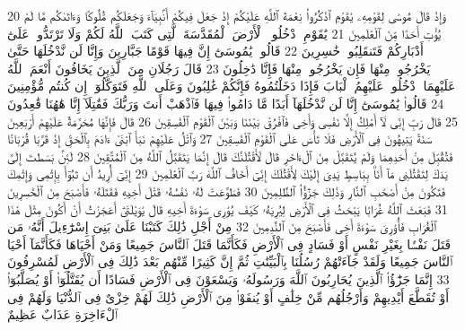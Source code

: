 {\tiny\colorbox{cl_aya}{20}} وَإِذْ قَالَ مُوسَىٰ لِقَوْمِهِۦ يَٰقَوْمِ ٱذْكُرُوا۟ نِعْمَةَ ٱللَّهِ عَلَيْكُمْ إِذْ جَعَلَ فِيكُمْ أَنۢبِيَآءَ وَجَعَلَكُم مُّلُوكًا وَءَاتَىٰكُم مَّا لَمْ يُؤْتِ أَحَدًا مِّنَ ٱلْعَٰلَمِينَ
{\tiny\colorbox{cl_aya}{21}} يَٰقَوْمِ ٱدْخُلُوا۟ ٱلْأَرْضَ ٱلْمُقَدَّسَةَ ٱلَّتِى كَتَبَ ٱللَّهُ لَكُمْ وَلَا تَرْتَدُّوا۟ عَلَىٰٓ أَدْبَارِكُمْ فَتَنقَلِبُوا۟ خَٰسِرِينَ
{\tiny\colorbox{cl_aya}{22}} قَالُوا۟ يَٰمُوسَىٰٓ إِنَّ فِيهَا قَوْمًا جَبَّارِينَ وَإِنَّا لَن نَّدْخُلَهَا حَتَّىٰ يَخْرُجُوا۟ مِنْهَا فَإِن يَخْرُجُوا۟ مِنْهَا فَإِنَّا دَٰخِلُونَ
{\tiny\colorbox{cl_aya}{23}} قَالَ رَجُلَانِ مِنَ ٱلَّذِينَ يَخَافُونَ أَنْعَمَ ٱللَّهُ عَلَيْهِمَا ٱدْخُلُوا۟ عَلَيْهِمُ ٱلْبَابَ فَإِذَا دَخَلْتُمُوهُ فَإِنَّكُمْ غَٰلِبُونَ وَعَلَى ٱللَّهِ فَتَوَكَّلُوٓا۟ إِن كُنتُم مُّؤْمِنِينَ
{\tiny\colorbox{cl_aya}{24}} قَالُوا۟ يَٰمُوسَىٰٓ إِنَّا لَن نَّدْخُلَهَآ أَبَدًا مَّا دَامُوا۟ فِيهَا فَٱذْهَبْ أَنتَ وَرَبُّكَ فَقَٰتِلَآ إِنَّا هَٰهُنَا قَٰعِدُونَ
{\tiny\colorbox{cl_aya}{25}} قَالَ رَبِّ إِنِّى لَآ أَمْلِكُ إِلَّا نَفْسِى وَأَخِى فَٱفْرُقْ بَيْنَنَا وَبَيْنَ ٱلْقَوْمِ ٱلْفَٰسِقِينَ
{\tiny\colorbox{cl_aya}{26}} قَالَ فَإِنَّهَا مُحَرَّمَةٌ عَلَيْهِمْ أَرْبَعِينَ سَنَةً يَتِيهُونَ فِى ٱلْأَرْضِ فَلَا تَأْسَ عَلَى ٱلْقَوْمِ ٱلْفَٰسِقِينَ
{\tiny\colorbox{cl_aya}{27}} وَٱتْلُ عَلَيْهِمْ نَبَأَ ٱبْنَىْ ءَادَمَ بِٱلْحَقِّ إِذْ قَرَّبَا قُرْبَانًا فَتُقُبِّلَ مِنْ أَحَدِهِمَا وَلَمْ يُتَقَبَّلْ مِنَ ٱلْءَاخَرِ قَالَ لَأَقْتُلَنَّكَ قَالَ إِنَّمَا يَتَقَبَّلُ ٱللَّهُ مِنَ ٱلْمُتَّقِينَ
{\tiny\colorbox{cl_aya}{28}} لَئِنۢ بَسَطتَ إِلَىَّ يَدَكَ لِتَقْتُلَنِى مَآ أَنَا۠ بِبَاسِطٍ يَدِىَ إِلَيْكَ لِأَقْتُلَكَ إِنِّىٓ أَخَافُ ٱللَّهَ رَبَّ ٱلْعَٰلَمِينَ
{\tiny\colorbox{cl_aya}{29}} إِنِّىٓ أُرِيدُ أَن تَبُوٓأَ بِإِثْمِى وَإِثْمِكَ فَتَكُونَ مِنْ أَصْحَٰبِ ٱلنَّارِ وَذَٰلِكَ جَزَٰٓؤُا۟ ٱلظَّٰلِمِينَ
{\tiny\colorbox{cl_aya}{30}} فَطَوَّعَتْ لَهُۥ نَفْسُهُۥ قَتْلَ أَخِيهِ فَقَتَلَهُۥ فَأَصْبَحَ مِنَ ٱلْخَٰسِرِينَ
{\tiny\colorbox{cl_aya}{31}} فَبَعَثَ ٱللَّهُ غُرَابًا يَبْحَثُ فِى ٱلْأَرْضِ لِيُرِيَهُۥ كَيْفَ يُوَٰرِى سَوْءَةَ أَخِيهِ قَالَ يَٰوَيْلَتَىٰٓ أَعَجَزْتُ أَنْ أَكُونَ مِثْلَ هَٰذَا ٱلْغُرَابِ فَأُوَٰرِىَ سَوْءَةَ أَخِى فَأَصْبَحَ مِنَ ٱلنَّٰدِمِينَ
{\tiny\colorbox{cl_aya}{32}} مِنْ أَجْلِ ذَٰلِكَ كَتَبْنَا عَلَىٰ بَنِىٓ إِسْرَٰٓءِيلَ أَنَّهُۥ مَن قَتَلَ نَفْسًۢا بِغَيْرِ نَفْسٍ أَوْ فَسَادٍ فِى ٱلْأَرْضِ فَكَأَنَّمَا قَتَلَ ٱلنَّاسَ جَمِيعًا وَمَنْ أَحْيَاهَا فَكَأَنَّمَآ أَحْيَا ٱلنَّاسَ جَمِيعًا وَلَقَدْ جَآءَتْهُمْ رُسُلُنَا بِٱلْبَيِّنَٰتِ ثُمَّ إِنَّ كَثِيرًا مِّنْهُم بَعْدَ ذَٰلِكَ فِى ٱلْأَرْضِ لَمُسْرِفُونَ
{\tiny\colorbox{cl_aya}{33}} إِنَّمَا جَزَٰٓؤُا۟ ٱلَّذِينَ يُحَارِبُونَ ٱللَّهَ وَرَسُولَهُۥ وَيَسْعَوْنَ فِى ٱلْأَرْضِ فَسَادًا أَن يُقَتَّلُوٓا۟ أَوْ يُصَلَّبُوٓا۟ أَوْ تُقَطَّعَ أَيْدِيهِمْ وَأَرْجُلُهُم مِّنْ خِلَٰفٍ أَوْ يُنفَوْا۟ مِنَ ٱلْأَرْضِ ذَٰلِكَ لَهُمْ خِزْىٌ فِى ٱلدُّنْيَا وَلَهُمْ فِى ٱلْءَاخِرَةِ عَذَابٌ عَظِيمٌ
